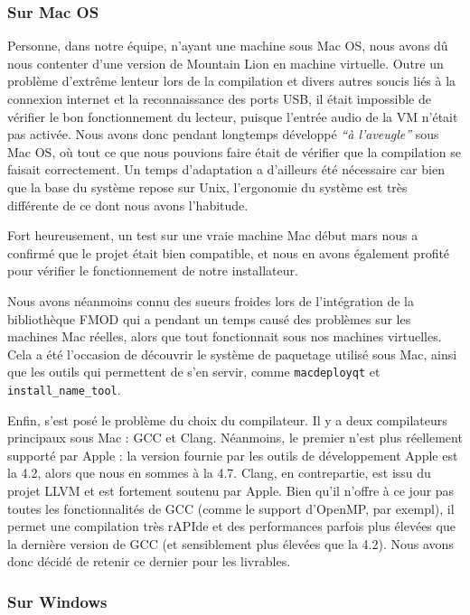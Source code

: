 \subsubsection*{Sur Mac OS}

Personne, dans notre équipe, n'ayant une machine sous Mac OS, nous avons dû nous contenter d'une version de Mountain Lion en machine virtuelle. Outre un problème d'extrême lenteur lors de la compilation et divers autres soucis liés à la connexion internet et la reconnaissance des ports USB, il était impossible de vérifier le bon fonctionnement du lecteur, puisque l'entrée audio de la VM n'était pas activée. Nous avons donc pendant longtemps développé \textit{``à l'aveugle''} sous Mac OS, où tout ce que nous pouvions faire était de vérifier que la compilation se faisait correctement.
Un temps d'adaptation a d'ailleurs été nécessaire car bien que la base du système repose sur Unix, l'ergonomie du système est très différente
de ce dont nous avons l'habitude.

Fort heureusement, un test sur une vraie machine Mac début mars nous a confirmé que le projet était bien compatible, et nous en avons également profité pour vérifier le fonctionnement de notre installateur.

Nous avons néanmoins connu des sueurs froides lors de l'intégration de la bibliothèque FMOD qui a pendant un temps causé des
problèmes sur les machines Mac réelles, alors que tout fonctionnait sous nos machines virtuelles. Cela a été l'occasion de découvrir
le système de paquetage utilisé sous Mac, ainsi que les outils qui permettent de s'en servir, comme \texttt{macdeployqt} et \texttt{install\_name\_tool}.

Enfin, s'est posé le problème du choix du compilateur. Il y a deux compilateurs principaux sous Mac : \ac{GCC} et Clang.
Néanmoins, le premier n'est plus réellement supporté par Apple : la version fournie par les outils de développement Apple est la 4.2,
alors que nous en sommes à la 4.7. Clang, en contrepartie, est issu du projet LLVM et est fortement soutenu par Apple.
Bien qu'il n'offre à ce jour pas toutes les fonctionnalités de \ac{GCC} (comme le support d'OpenMP, par exempl), il permet une
compilation très r\ac{API}de et des performances parfois plus élevées que la dernière version de \ac{GCC} (et sensiblement plus élevées que la 4.2).
Nous avons donc décidé de retenir ce dernier pour les livrables.
\subsubsection*{Sur Windows}

